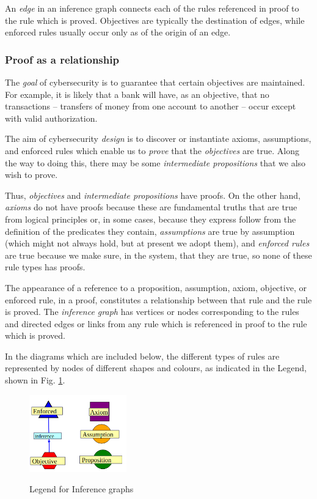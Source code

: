 An {\em edge} in an inference graph connects each of the rules referenced in proof to the rule which is proved. Objectives are typically the destination of edges, while enforced rules usually occur only as of the origin of an edge.

\subsubsection{Proof as a relationship}
The {\em goal} of cybersecurity is to guarantee that certain objectives are maintained. For example, it is likely that a bank will have, as an objective, that no transactions -- transfers of money from one account to another -- occur except with valid authorization.

The aim of cybersecurity {\em design} is to discover or instantiate axioms, assumptions, and enforced rules which enable us to {\em prove} that the {\em objectives} are true. Along the way to doing this, there may be some {\em intermediate propositions} that we also wish to prove.

Thus, {\em objectives} and {\em intermediate propositions} have proofs. On the other hand, {\em axioms} do not have proofs because these are fundamental truths that are true from logical principles or, in some cases, because they express follow from the definition of the predicates they contain, {\em assumptions} are true by assumption (which might not always hold, but at present we adopt them), and {\em enforced rules} are true because we make sure, in the system, that they are true, so none of these rule types has proofs.

The appearance of a reference to a proposition, assumption, axiom, objective, or enforced rule, in a proof,  constitutes a relationship between that rule and the rule is proved. The {\em inference graph} has vertices or nodes corresponding to the rules and directed edges or links from any rule which is referenced in proof to the rule which is proved.


In the diagrams which are included below, the different types of rules are represented by nodes of different shapes and colours, as  indicated in the Legend, shown in Fig. \ref{legend}. \begin{figure}[bhpt]
	\centering
		\leavevmode\includegraphics[width=42mm]{figures/legend.png}\ \\
		\caption{Legend for Inference graphs}\label{legend}
\end{figure}




